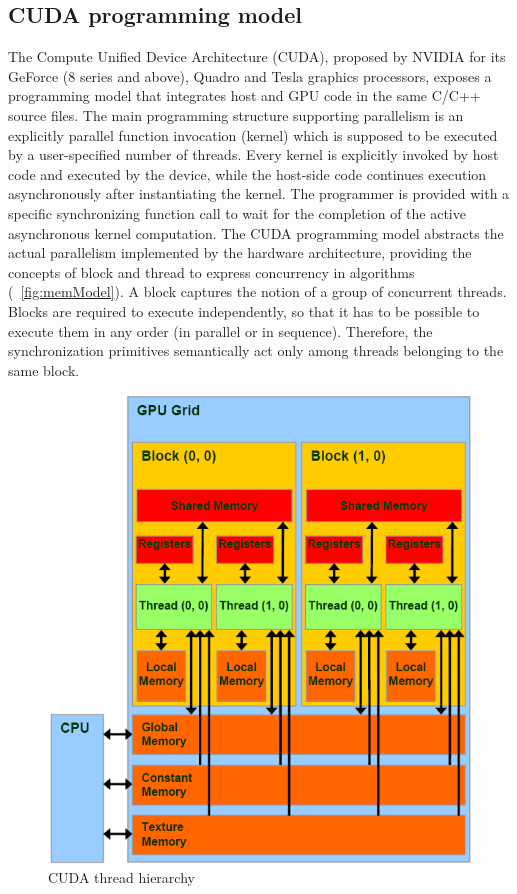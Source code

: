 \subsection{CUDA programming model}
   The Compute Unified Device Architecture (CUDA), proposed by NVIDIA for its GeForce (8 series and above), Quadro and Tesla
graphics processors, exposes a programming model that integrates host and GPU code in the same C/C++ source files.\newline
The main programming structure supporting parallelism is an explicitly parallel function invocation (kernel) which
is supposed to be executed by a user-specified number of threads.
Every kernel is explicitly invoked by host code and executed by the device, while the host-side code continues execution
 asynchronously after instantiating the kernel. The programmer is provided with a specific synchronizing function call
to wait for the completion of the active asynchronous kernel computation.\newline
   The CUDA programming model abstracts the actual parallelism implemented by the hardware architecture,
providing the concepts of block and thread to express concurrency in algorithms (\figurename~\ref{fig:memModel}).
A block captures the notion of a group of concurrent threads. Blocks are required to execute independently, so that it has
to be possible to execute them in any order (in parallel or in sequence). Therefore, the synchronization primitives semantically
act only among threads belonging to the same block.
\begin{figure}[h!tp]
    \centering
     \includegraphics[width=1\textwidth]{./img/memModel}
\caption{CUDA thread hierarchy}\label{fig:threadHier}
    \end{figure}
